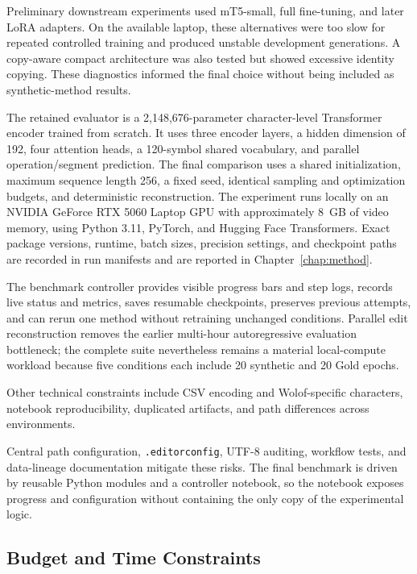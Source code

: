 \documentclass[12pt, a4paper, twoside, openany]{report}
\begin{document}
Preliminary downstream experiments used mT5-small, full fine-tuning, and later LoRA adapters. On the available laptop, these alternatives were too slow for repeated controlled training and produced unstable development generations. A copy-aware compact architecture was also tested but showed excessive identity copying. These diagnostics informed the final choice without being included as synthetic-method results.

The retained evaluator is a 2,148,676-parameter character-level Transformer encoder trained from scratch. It uses three encoder layers, a hidden dimension of 192, four attention heads, a 120-symbol shared vocabulary, and parallel operation/segment prediction. The final comparison uses a shared initialization, maximum sequence length 256, a fixed seed, identical sampling and optimization budgets, and deterministic reconstruction. The experiment runs locally on an NVIDIA GeForce RTX 5060 Laptop GPU with approximately 8~GB of video memory, using Python 3.11, PyTorch, and Hugging Face Transformers. Exact package versions, runtime, batch sizes, precision settings, and checkpoint paths are recorded in run manifests and are reported in Chapter~\ref{chap:method}.

The benchmark controller provides visible progress bars and step logs, records live status and metrics, saves resumable checkpoints, preserves previous attempts, and can rerun one method without retraining unchanged conditions. Parallel edit reconstruction removes the earlier multi-hour autoregressive evaluation bottleneck; the complete suite nevertheless remains a material local-compute workload because five conditions each include 20 synthetic and 20 Gold epochs.

Other technical constraints include CSV encoding and Wolof-specific characters, notebook reproducibility, duplicated artifacts, and path differences across environments.

Central path configuration, \texttt{.editorconfig}, UTF-8 auditing, workflow tests, and data-lineage documentation mitigate these risks. The final benchmark is driven by reusable Python modules and a controller notebook, so the notebook exposes progress and configuration without containing the only copy of the experimental logic.


\subsection{Budget and Time Constraints}
\end{document}
